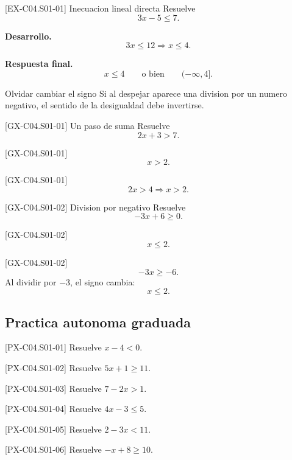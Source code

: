 \begin{solvedexample}{[EX-C04.S01-01] Inecuacion lineal directa}
Resuelve
\[
3x-5\leq 7.
\]

\textbf{Desarrollo.}
\[
3x\leq 12 \Longrightarrow x\leq 4.
\]

\textbf{Respuesta final.}
\[
x\leq 4 \qquad \text{o bien} \qquad (-\infty,4].
\]
\end{solvedexample}

\begin{commonerror}{Olvidar cambiar el signo}
Si al despejar aparece una division por un numero negativo, el sentido de la desigualdad debe
invertirse.
\end{commonerror}

\begin{guidedexercise}{[GX-C04.S01-01] Un paso de suma}
Resuelve
\[
2x+3>7.
\]
\end{guidedexercise}

\begin{shortanswer}{[GX-C04.S01-01]}
\[
x>2.
\]
\end{shortanswer}

\begin{fullsolution}{[GX-C04.S01-01]}
\[
2x>4 \Longrightarrow x>2.
\]
\end{fullsolution}

\begin{guidedexercise}{[GX-C04.S01-02] Division por negativo}
Resuelve
\[
-3x+6\geq 0.
\]
\end{guidedexercise}

\begin{shortanswer}{[GX-C04.S01-02]}
\[
x\leq 2.
\]
\end{shortanswer}

\begin{fullsolution}{[GX-C04.S01-02]}
\[
-3x\geq -6.
\]
Al dividir por \(-3\), el signo cambia:
\[
x\leq 2.
\]
\end{fullsolution}

\subsection*{Practica autonoma graduada}
\begin{exercise}{[PX-C04.S01-01] Resuelve \(x-4<0\).}
\end{exercise}
\begin{exercise}{[PX-C04.S01-02] Resuelve \(5x+1\geq 11\).}
\end{exercise}
\begin{exercise}{[PX-C04.S01-03] Resuelve \(7-2x>1\).}
\end{exercise}
\begin{exercise}{[PX-C04.S01-04] Resuelve \(4x-3\leq 5\).}
\end{exercise}
\begin{exercise}{[PX-C04.S01-05] Resuelve \(2-3x<11\).}
\end{exercise}
\begin{exercise}{[PX-C04.S01-06] Resuelve \(-x+8\geq 10\).}
\end{exercise}


